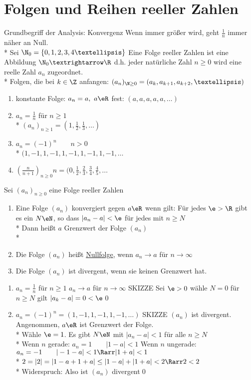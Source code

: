 \chapter{Folgen und Reihen reeller Zahlen}
Grundbegriff der Analysis: Konvergenz
\bsp
Wenn \nN{} immer größer wird, geht $\frac{1}{n}$ immer näher an Null.\\*
Sei $\N_0=\{0,1,2,3,4…\}$
\Def
Eine Folge reeller Zahlen ist eine Abbildung $\N_0→\R$ d.h. jeder natürliche Zahl $n\geq 0$ wird eine reelle Zahl $a_n$ zugeordnet.\\*
Folgen, die bei $k\in\Z$ anfangen: $(a_n)_{\N\geq 0}=(a_k,a_{k+1},a_{k+2},…)$
\bsp
\begin{enumerate}
\item{konstante Folge: $a_n=a,\ a\eR$ fest: $(a,a,a,a,a,…)$}
\item{$a_n=\frac{1}{n}$ für $n\geq 1$\\*
$(a_n)_{n\geq 1}=(1,\frac{1}{2},\frac{1}{3},…)$}
\item{$a_n=(-1)^n\qquad n>0$\\*
$(1,-1,1,-1,1,-1,1,-1,1,-1,…$}
\item{$(\frac{n}{n+1})_{n\geq 0}n=(0,\frac{1}{2},\frac{2}{3},\frac{3}{4},\frac{4}{5},…$}
\end{enumerate}
%
\Def
Sei $(a_n)_{n\geq 0}$ eine Folge reeller Zahlen
\begin{enumerate}
\item{Eine Folge $(a_n)$ konvergiert gegen $a\eR$ wenn gilt: Für jedes $\e>\R$ gibt es ein $N\eN$, so dass $|a_n-a|<\e$ für jedes \nN{} mit $n\geq N$\\*
Dann heißt $a$ Grenzwert der Folge $(a_n)$\\*
}
\item{Die Folge $(a_n)$ heißt \ul{Nullfolge}, wenn $a_n→a$ für $n→∞$}
\item{Die Folge $(a_n)$ ist divergent, wenn sie keinen Grenzwert hat.}
\end{enumerate}
%
\bsp
\begin{enumerate}
\item{$a_n=\frac{1}{n}$ für $n\geq 1$
 $a_n→a$ für $n→∞$ SKIZZE %
\bew
Sei $\e>0$ wähle $N=0$ für $n\geq N$ gilt $|a_k-a|=0<\e$\qed}
\item{$a_n=(-1)^n=(1,-1,1,-1,1,-1,…)$ SKIZZE %
 $(a_n)$ ist divergent. 
\bew
Angenommen, $a\eR$ ist Grenzwert der Folge.\\*
Wähle $\e=1$. Es gibt $N\eN$ mit $|a_n-a|<1$ für alle $n\geq N$\\*
Wenn $n$ gerade: $a_n=1\qquad |1-a|<1$
Wenn $n$ ungerade: $a_n=-1\qquad |-1-a|<1 \Rarr |1+a|<1$\\*
$2=|2|=|1-a+1+a|\leq |1-a|+|1+a|<2 \Rarr 2<2$\\*
Widerspruch: Also ist $(a_n)$ divergent\qed}
\end{enumerate}